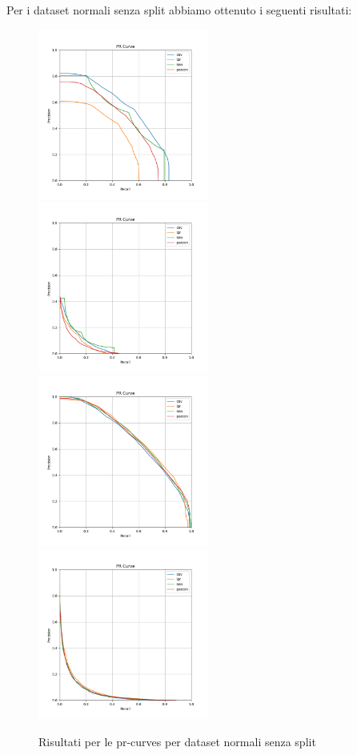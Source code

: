 Per i dataset normali senza split abbiamo ottenuto i seguenti risultati:

\begin{figure}[!ht]
    \includegraphics[width=0.5\textwidth]{../images/toyexperiments/prcurves/PRCurve_nosplit_k4_s1.png}
    \includegraphics[width=0.5\textwidth]{../images/toyexperiments/prcurves/PRCurve_nosplit_k4_s3.png}
    \includegraphics[width=0.5\textwidth]{../images/toyexperiments/prcurves/PRCurve_nosplit_ksqrt_s1.png}
    \includegraphics[width=0.5\textwidth]{../images/toyexperiments/prcurves/PRCurve_nosplit_ksqrt_s3.png}
    \caption{Risultati per le pr-curves per dataset normali senza split}
\end{figure}

